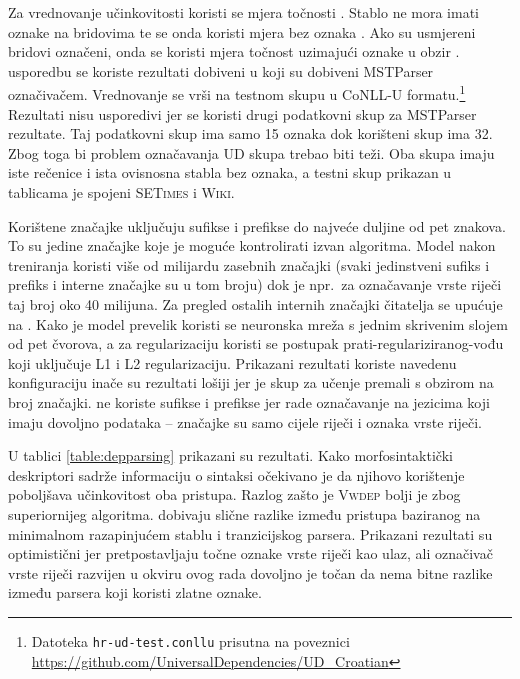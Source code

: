 Za vrednovanje učinkovitosti koristi se mjera točnosti . Stablo
ne mora imati oznake na bridovima te se onda koristi mjera bez oznaka
. Ako su usmjereni bridovi označeni, onda
se koristi mjera točnost uzimajući oznake u obzir . usporedbu se koriste rezultati dobiveni u \citep{agic2013three}
koji su dobiveni MSTParser označivačem. Vrednovanje se vrši na testnom skupu u
CoNLL-U formatu.\footnote{Datoteka \texttt{hr-ud-test.conllu} prisutna na
poveznici \url{https://github.com/UniversalDependencies/UD_Croatian}} Rezultati
nisu usporedivi jer se koristi drugi podatkovni skup za MSTParser rezultate. Taj
podatkovni skup ima samo 15 oznaka dok korišteni skup ima 32. Zbog toga bi
problem označavanja UD skupa trebao biti teži. Oba skupa imaju iste rečenice i
ista ovisnosna stabla bez oznaka, a testni skup prikazan u tablicama je spojeni
\textsc{SETimes} i \textsc{Wiki}.

Korištene značajke uključuju sufikse i prefikse do najveće duljine od pet
znakova. To su jedine značajke koje je moguće kontrolirati izvan algoritma.
Model nakon treniranja koristi više od milijardu zasebnih značajki (svaki
jedinstveni sufiks i prefiks i interne značajke su u tom broju) dok je npr.~za
označavanje vrste riječi taj broj oko 40 milijuna. Za pregled ostalih internih
značajki čitatelja se upućuje na \citep{chang2015learning}. Kako je model
prevelik koristi se neuronska mreža s jednim skrivenim slojem od pet čvorova, a
za regularizaciju koristi se postupak prati-regulariziranog-vođu  koji uključuje L1 i L2 regularizaciju. Prikazani
rezultati koriste navedenu konfiguraciju inače su rezultati lošiji jer je skup
za učenje premali s obzirom na broj značajki. \citet{chang2015learning} ne
koriste sufikse i prefikse jer rade označavanje na jezicima koji imaju dovoljno
podataka -- značajke su samo cijele riječi i oznaka vrste riječi.

U tablici \ref{table:depparsing} prikazani su rezultati. Kako morfosintaktički
deskriptori sadrže informaciju o sintaksi očekivano je da njihovo korištenje
poboljšava učinkovitost oba pristupa. Razlog zašto je \textsc{Vwdep} bolji je
zbog superiornijeg algoritma. \citet{cer2010parsing} dobivaju slične razlike
između pristupa baziranog na minimalnom razapinjućem stablu i tranzicijskog
parsera. Prikazani rezultati su optimistični jer pretpostavljaju točne oznake
vrste riječi kao ulaz, ali označivač vrste riječi razvijen u okviru ovog rada
dovoljno je točan da nema bitne razlike između parsera koji koristi zlatne
oznake.


